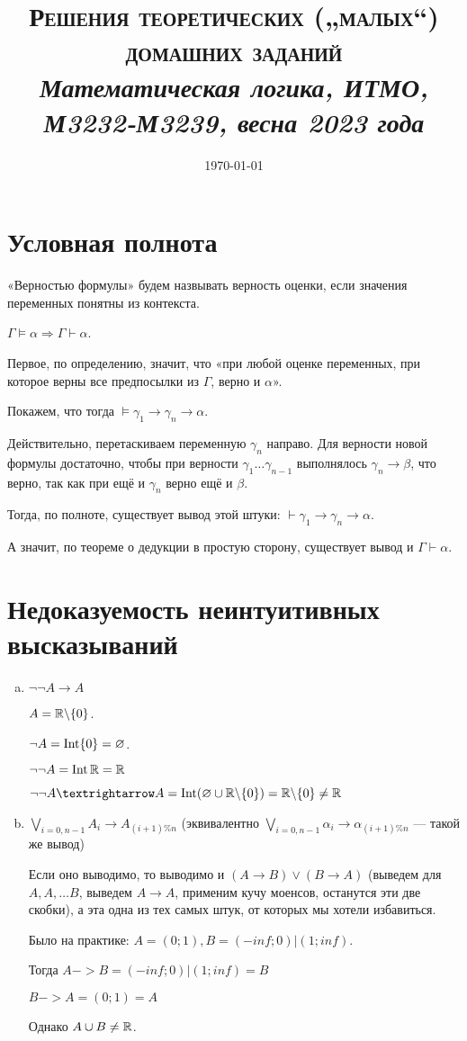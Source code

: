 \documentclass[12pt, a4paper]{article}
\title{{\Large\textsc{Решения \textbf{теоретических („малых“) домашних заданий}}}\\
\it Математическая логика, ИТМО, М3232-М3239, весна 2023 года}
\author{
  \vova
}
\date{\today}
\begin{document}
  \tittoc


\setcounter{section}{0}

\section{Условная полнота}

«Верностью формулы» будем назвывать верность оценки, если значения переменных понятны из контекста.

$\Gamma \vDash \alpha \Rightarrow \Gamma \vdash \alpha$.

Первое, по определению, значит, что «при любой оценке переменных, при которое верны все предпосылки из $\Gamma$, верно и $\alpha$».



Покажем, что тогда $\vDash \gamma_1 → \gamma_n → \alpha$.

Действительно, перетаскиваем переменную $\gamma_n$ направо. Для верности новой формулы достаточно, чтобы при верности $\gamma_1 … \gamma_{n - 1}$ выполнялось $\gamma_n → \beta$,
что верно, так как при ещё и $\gamma_n$ верно ещё и $\beta$.


Тогда, по полноте, существует вывод этой штуки: $\vdash \gamma_1 → \gamma_n → \alpha$.

А значит, по теореме о дедукции в простую сторону, существует вывод и $\Gamma \vdash \alpha$.



\section{Недоказуемость неинтуитивных высказываний}

\begin{enumerate}[(a)]
    \item $\neg \neg A → A$

    $A = {\mathbb{R}} \backslash \{0\}$.
    
    $\neg A = \operatorname{Int} \{0\} = \varnothing$.
    
    $\neg \neg A = \operatorname{Int} {\mathbb{R}} = {\mathbb{R}}$
    
    $\neg \neg A → A = \Int (\varnothing \cup \sR \backslash \{0\}) = \sR \backslash \{0\} \neq \sR$
    
    \setcounter{enumi}{4}
    \item $\bigvee_{i=0, n-1} A_i \rightarrow A_{(i+1) \% n}$ (эквивалентно $\bigvee_{i=0, n-1} \alpha_i \rightarrow \alpha_{(i+1) \% n}$ — такой же вывод)
    
    Если оно выводимо, то выводимо и $(A → B) \vee (B → A)$ (выведем для $A, A, … B$, выведем $A → A$, применим кучу моенсов, останутся эти две скобки),
    а эта одна из тех самых штук, от которых мы хотели избавиться.

    Было на практике: $A = (0; 1), B = (-inf; 0) | (1; inf)$.

    Тогда $A -> B = (-inf; 0) | (1; inf) = B$
    
    $B -> A = (0; 1) = A$

    Однако $A \cup B \neq {\mathbb{R}}$.

\end{enumerate}
\end{document}
